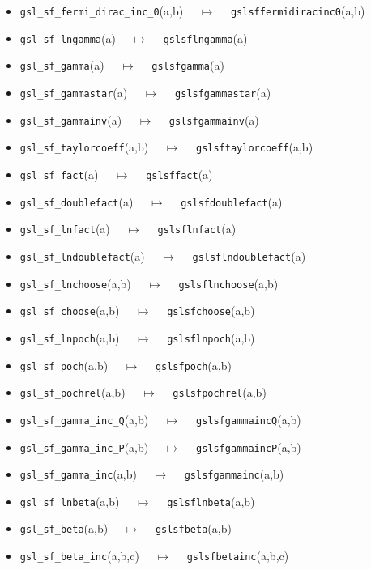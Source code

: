 \documentclass[a4paper,twoside,12pt]{book}
\begin{document}
{\begin{itemize}
\item \texttt{gsl\_sf\_fermi\_dirac\_inc\_0}(a,b) $\quad \mapsto\quad $ \texttt{gslsffermidiracinc0}(a,b) 
\item \texttt{gsl\_sf\_lngamma}(a) $\quad \mapsto\quad $ \texttt{gslsflngamma}(a) 
\item \texttt{gsl\_sf\_gamma}(a) $\quad \mapsto\quad $ \texttt{gslsfgamma}(a) 
\item \texttt{gsl\_sf\_gammastar}(a) $\quad \mapsto\quad $ \texttt{gslsfgammastar}(a) 
\item \texttt{gsl\_sf\_gammainv}(a) $\quad \mapsto\quad $ \texttt{gslsfgammainv}(a) 
\item \texttt{gsl\_sf\_taylorcoeff}(a,b) $\quad \mapsto\quad $ \texttt{gslsftaylorcoeff}(a,b) 
\item \texttt{gsl\_sf\_fact}(a) $\quad \mapsto\quad $ \texttt{gslsffact}(a) 
\item \texttt{gsl\_sf\_doublefact}(a) $\quad \mapsto\quad $ \texttt{gslsfdoublefact}(a) 
\item \texttt{gsl\_sf\_lnfact}(a) $\quad \mapsto\quad $ \texttt{gslsflnfact}(a) 
\item \texttt{gsl\_sf\_lndoublefact}(a) $\quad \mapsto\quad $ \texttt{gslsflndoublefact}(a) 
\item \texttt{gsl\_sf\_lnchoose}(a,b) $\quad \mapsto\quad $ \texttt{gslsflnchoose}(a,b) 
\item \texttt{gsl\_sf\_choose}(a,b) $\quad \mapsto\quad $ \texttt{gslsfchoose}(a,b) 
\item \texttt{gsl\_sf\_lnpoch}(a,b) $\quad \mapsto\quad $ \texttt{gslsflnpoch}(a,b) 
\item \texttt{gsl\_sf\_poch}(a,b) $\quad \mapsto\quad $ \texttt{gslsfpoch}(a,b) 
\item \texttt{gsl\_sf\_pochrel}(a,b) $\quad \mapsto\quad $ \texttt{gslsfpochrel}(a,b) 
\item \texttt{gsl\_sf\_gamma\_inc\_Q}(a,b) $\quad \mapsto\quad $ \texttt{gslsfgammaincQ}(a,b) 
\item \texttt{gsl\_sf\_gamma\_inc\_P}(a,b) $\quad \mapsto\quad $ \texttt{gslsfgammaincP}(a,b) 
\item \texttt{gsl\_sf\_gamma\_inc}(a,b) $\quad \mapsto\quad $ \texttt{gslsfgammainc}(a,b) 
\item \texttt{gsl\_sf\_lnbeta}(a,b) $\quad \mapsto\quad $ \texttt{gslsflnbeta}(a,b) 
\item \texttt{gsl\_sf\_beta}(a,b) $\quad \mapsto\quad $ \texttt{gslsfbeta}(a,b) 
\item \texttt{gsl\_sf\_beta\_inc}(a,b,c) $\quad \mapsto\quad $ \texttt{gslsfbetainc}(a,b,c) 

\end{itemize}}
\end{document}
